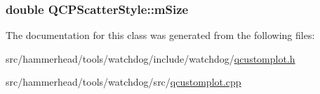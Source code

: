 \subsubsection[{\texorpdfstring{m\+Size}{mSize}}]{\setlength{\rightskip}{0pt plus 5cm}double Q\+C\+P\+Scatter\+Style\+::m\+Size\hspace{0.3cm}{\ttfamily [protected]}}\hypertarget{classQCPScatterStyle_a757da98671eb06b221979373ac2cec91}{}\label{classQCPScatterStyle_a757da98671eb06b221979373ac2cec91}


The documentation for this class was generated from the following files\+:\begin{DoxyCompactItemize}
\item 
src/hammerhead/tools/watchdog/include/watchdog/\hyperlink{qcustomplot_8h}{qcustomplot.\+h}\item 
src/hammerhead/tools/watchdog/src/\hyperlink{qcustomplot_8cpp}{qcustomplot.\+cpp}\end{DoxyCompactItemize}

